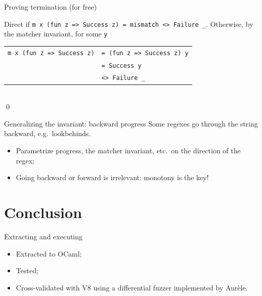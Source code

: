 \documentclass[aspectratio=169]{beamer}
\def\inlinecode#1{\lstinline[language=Coq,basicstyle=\ttfamily]{#1}}
\begin{document}
    \begin{frame}{Proving termination (for free)}
        
        \pause{}
        Direct if \inlinecode{m x (fun z => Success z) = mismatch <> Failure _}.
        Otherwise, by the matcher invariant, for some \inlinecode{y}\\
        \begin{tabular}{ll}
            \lstinline[language=Coq]{m x (fun z => Success z)} & \inlinecode{= (fun z => Success z) y} \\
            & \inlinecode{= Success y} \\
            & \inlinecode{<> Failure _}
        \end{tabular}\\
        \qed{}
    \end{frame}

    \begin{frame}{Generalizing the invariant: backward progress}
        Some regexes go through the string backward, e.g.\ lookbehinds.
        \pause{}
        \begin{itemize}
            \item Parametrize progress, the matcher invariant, etc.\ on the direction of the regex;
            
            \pause{}
            \item Going backward or forward is irrelevant: monotony is the key!
        \end{itemize}
    \end{frame}

    \section{Conclusion}\label{sec:conclusion}

    \begin{frame}{Extracting and executing}
        \begin{itemize}
            \item<1-> Extracted to OCaml;
            \item<2-> Tested;
            \item<3-> Cross-validated with V8 using a differential fuzzer implemented by Aur\`{e}le.
        \end{itemize}
    \end{frame}
\end{document}

